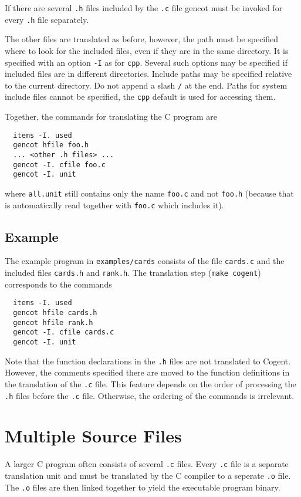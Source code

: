 \documentclass[a4paper]{report}
\newcommand{\code}[1]{\textnormal{\texttt{#1}}}
\begin{document}
If there are several \code{.h} files included by the \code{.c} file gencot must be invoked for every \code{.h} file
separately.

The other files are translated as before, however, the path must be specified where to look for the included files, even
if they are in the same directory. It is specified with an option \code{-I} as for \code{cpp}. Several such options may 
be specified if included files are in different directories. Include paths may be specified relative to the current 
directory. Do not append a slash \code{/} at the end. Paths for system include files cannot be specified, the \code{cpp} 
default is used for accessing them.

Together, the commands for translating the C program are
\begin{verbatim}
  items -I. used
  gencot hfile foo.h
  ... <other .h files> ...
  gencot -I. cfile foo.c
  gencot -I. unit
\end{verbatim}
where \code{all.unit} still contains only the name \code{foo.c} and not \code{foo.h} (because that is automatically
read together with \code{foo.c} which includes it).

\subsection{Example}

The example program in \code{examples/cards} consists of the file \code{cards.c} and the included files \code{cards.h}
and \code{rank.h}. The translation step (\code{make cogent}) corresponds to the commands
\begin{verbatim}
  items -I. used
  gencot hfile cards.h
  gencot hfile rank.h
  gencot -I. cfile cards.c
  gencot -I. unit
\end{verbatim}

Note that the function declarations in the \code{.h} files are not translated to Cogent. However, the comments specified 
there are moved to the function definitions in the translation of the \code{.c} file. This feature depends on the order of
processing the \code{.h} files before the \code{.c} file. Otherwise, the ordering of the commands is irrelevant.

\section{Multiple Source Files}
\label{struct-multi}

A larger C program often consists of several \code{.c} files. Every \code{.c} file is a separate translation unit and
must be translated by the C compiler to a seperate \code{.o} file. The \code{.o} files are then linked together to
yield the executable program binary.
\end{document}
